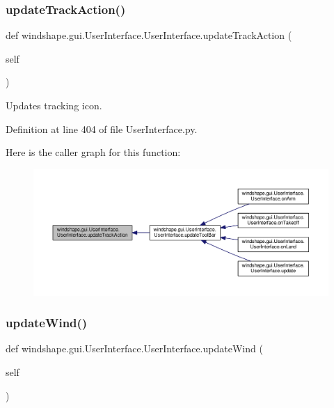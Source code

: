 \subsubsection{\texorpdfstring{update\+Track\+Action()}{updateTrackAction()}}
{\footnotesize\ttfamily def windshape.\+gui.\+User\+Interface.\+User\+Interface.\+update\+Track\+Action (\begin{DoxyParamCaption}\item[{}]{self }\end{DoxyParamCaption})}

\begin{DoxyVerb}Updates tracking icon.\end{DoxyVerb}
 

Definition at line 404 of file User\+Interface.\+py.

Here is the caller graph for this function\+:\nopagebreak
\begin{figure}[H]
\begin{center}
\leavevmode
\includegraphics[width=350pt]{classwindshape_1_1gui_1_1_user_interface_1_1_user_interface_adaa93924687bf5f63c18839c154a8d6d_icgraph}
\end{center}
\end{figure}
\mbox{\label{classwindshape_1_1gui_1_1_user_interface_1_1_user_interface_a3b931ffc0ac301822ae74b0dccafa426}} 
\subsubsection{\texorpdfstring{update\+Wind()}{updateWind()}}
{\footnotesize\ttfamily def windshape.\+gui.\+User\+Interface.\+User\+Interface.\+update\+Wind (\begin{DoxyParamCaption}\item[{}]{self }\end{DoxyParamCaption})}

